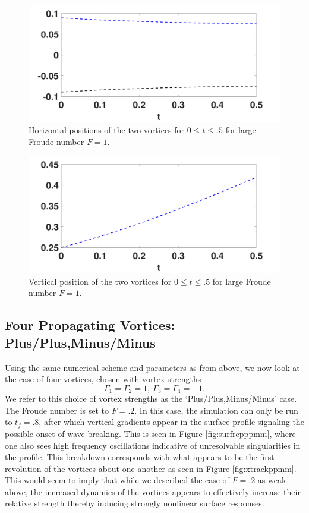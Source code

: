 \documentclass[a4paper,11pt]{article}
\begin{document}
\begin{figure}[!h]
\centering
\includegraphics[width=.75\textwidth]{xtrack_mu_pt2_F_1_tf_pt5}
\caption{Horizontal positions of the two vortices for $0\leq t \leq .5$ for large Froude number $F=1$.}
\end{figure}
\begin{figure}[!h]
\centering
\includegraphics[width=.75\textwidth]{ztrack_mu_pt2_F_1_tf_pt5}
\caption{Vertical position of the two vortices for $0\leq t \leq .5$ for large Froude number $F=1$.}
\end{figure}

\subsection*{Four Propagating Vortices: Plus/Plus,Minus/Minus}
Using the same numerical scheme and parameters as from above, we now look at the case of four vortices, chosen with vortex strengths
\[
\Gamma_{1}=\Gamma_{2}=1, ~ \Gamma_{3}=\Gamma_{4}=-1.
\]
We refer to this choice of vortex strengths as the `Plus/Plus,Minus/Minus' case.  The Froude number is set to $F=.2$.  In this case, the simulation can only be run to $t_{f}=.8$, after which vertical gradients appear in the surface profile signaling the possible onset of wave-breaking.  This is seen in Figure \ref{fig:surfrepppmm}, where one also sees high frequency oscillations indicative of unresolvable singularities in the profile.  This breakdown corresponds with what appears to be the first revolution of the vortices about one another as seen in Figure \ref{fig:xtrackppmm}.  This would seem to imply that while we described the case of $F=.2$ as weak above, the increased dynamics of the vortices appears to effectively increase their relative strength thereby inducing strongly nonlinear surface responses.   
\end{document}
